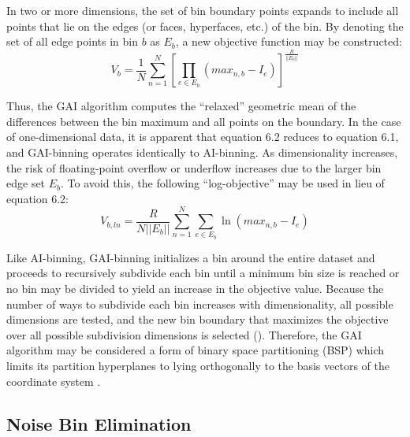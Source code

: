 \begin{doublespace}
In two or more dimensions, the set of bin boundary points expands to include
all points that lie on the edges (or faces, hyperfaces, etc.) of the bin.
By denoting the set of all edge points in bin $b$ as $E_b$, a new objective
function may be constructed:
\begin{equation}
V_b = \frac{1}{N}
  \sum_{n=1}^N \left[
    \prod_{e \in E_b} (max_{n,b} - I_e)
  \right]^\frac{R}{||E_b||}
\end{equation}

Thus, the GAI algorithm computes the ``relaxed'' geometric mean of the
differences between the bin maximum and all points on the boundary. In the
case of one-dimensional data, it is apparent that equation 6.2 reduces to
equation 6.1, and GAI-binning operates identically to AI-binning. As
dimensionality increases, the risk of floating-point overflow or underflow
increases due to the larger bin edge set $E_b$. To avoid this, the following
``log-objective'' may be used in lieu of equation 6.2:
\begin{equation}
V_{b,ln} = \frac{R}{N ||E_b||}
  \sum_{n=1}^N \sum_{e \in E_b}
    \ln(max_{n,b} - I_e)
\end{equation}

Like AI-binning, GAI-binning initializes a bin around the entire dataset and
proceeds to recursively subdivide each bin until a minimum bin size is reached
or no bin may be divided to yield an increase in the objective value. Because
the number of ways to subdivide each bin increases with dimensionality, all
possible dimensions are tested, and the new bin boundary that maximizes the
objective over all possible subdivision dimensions is selected
(). Therefore, the GAI algorithm may be considered
a form of binary space partitioning (BSP) which limits its partition
hyperplanes to lying orthogonally to the basis vectors of the coordinate
system \cite{deberg2000}.
\end{doublespace}

\subsection{Noise Bin Elimination}

